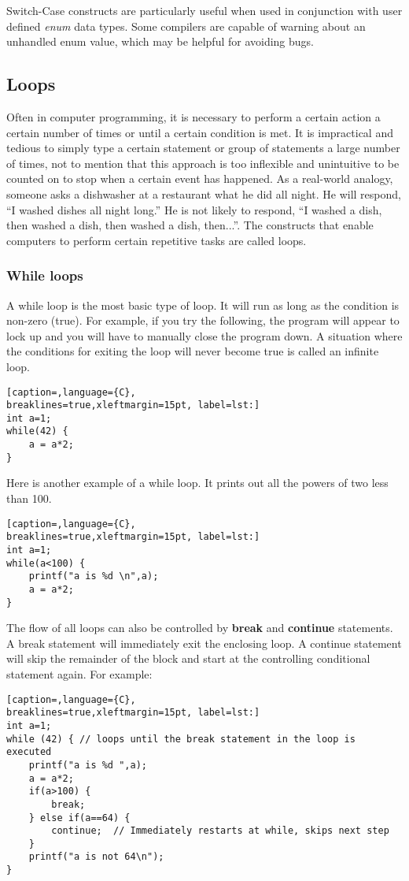 Switch-Case constructs are particularly useful when used in conjunction with
user defined \emph{enum} data types. Some compilers are capable of warning
about an unhandled enum value, which may be helpful for avoiding bugs.

\subsection{Loops}
Often in computer programming, it is necessary to perform a certain action a
certain number of times or until a certain condition is met. It is impractical
and tedious to simply type a certain statement or group of statements a large
number of times, not to mention that this approach is too inflexible and
unintuitive to be counted on to stop when a certain event has happened. As a
real-world analogy, someone asks a dishwasher at a restaurant what he did all
night. He will respond, ``I washed dishes all night long.'' He is not likely to
respond, ``I washed a dish, then washed a dish, then washed a dish, then...''.
The constructs that enable computers to perform certain repetitive tasks are
called loops.

\subsubsection{While loops}
A while loop is the most basic type of loop. It will run as long as the
condition is non-zero (true). For example, if you try the following, the
program will appear to lock up and you will have to manually close the program
down. A situation where the conditions for exiting the loop will never become
true is called an infinite loop. 
\lstset{basicstyle=\scriptsize, numbers=left, captionpos=b, tabsize=4}
\begin{lstlisting}[caption=,language={C},
breaklines=true,xleftmargin=15pt, label=lst:]
int a=1;
while(42) {
	a = a*2;
}
\end{lstlisting}

Here is another example of a while loop. It prints out all the powers of two
less than 100.
\lstset{basicstyle=\scriptsize, numbers=left, captionpos=b, tabsize=4}
\begin{lstlisting}[caption=,language={C},
breaklines=true,xleftmargin=15pt, label=lst:]
int a=1;
while(a<100) {
	printf("a is %d \n",a);
	a = a*2;
}
\end{lstlisting}

The flow of all loops can also be controlled by \textbf{break} and
\textbf{continue} statements. A break statement will immediately exit the
enclosing loop. A continue statement will skip the remainder of the block and
start at the controlling conditional statement again. For example:
\lstset{basicstyle=\scriptsize, numbers=left, captionpos=b, tabsize=4}
\begin{lstlisting}[caption=,language={C},
breaklines=true,xleftmargin=15pt, label=lst:]
int a=1;
while (42) { // loops until the break statement in the loop is executed
	printf("a is %d ",a);
	a = a*2;
	if(a>100) {
		break;
	} else if(a==64) {
		continue;  // Immediately restarts at while, skips next step
	}
	printf("a is not 64\n");
}
\end{lstlisting}

